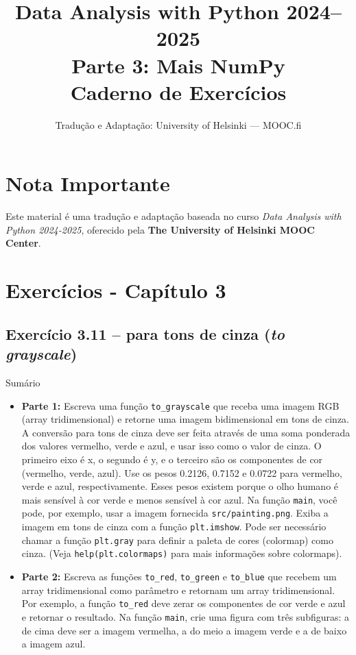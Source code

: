 \documentclass[11pt,a4paper]{article}
\title{\textbf{Data Analysis with Python 2024--2025}\\Parte 3: Mais NumPy\\\large Caderno de Exercícios}
\author{Tradução e Adaptação: University of Helsinki --- MOOC.fi}
\date{}
\begin{document}
\maketitle

\section*{Nota Importante}
Este material é uma tradução e adaptação baseada no curso \textit{Data Analysis with Python 2024-2025}, oferecido pela \textbf{The University of Helsinki MOOC Center}.

\tableofcontents
\newpage

\section{Exercícios - Capítulo 3}

\subsection*{Exercício 3.11 -- para tons de cinza (\textit{to grayscale})}

\begin{exercicio}{Sumário}
\begin{itemize}
    \item \textbf{Parte 1:} Escreva uma função \texttt{to\_grayscale} que receba uma imagem RGB (array tridimensional) e retorne uma imagem bidimensional em tons de cinza. A conversão para tons de cinza deve ser feita através de uma soma ponderada dos valores vermelho, verde e azul, e usar isso como o valor de cinza. O primeiro eixo é x, o segundo é y, e o terceiro são os componentes de cor (vermelho, verde, azul). Use os pesos 0.2126, 0.7152 e 0.0722 para vermelho, verde e azul, respectivamente. Esses pesos existem porque o olho humano é mais sensível à cor verde e menos sensível à cor azul. Na função \texttt{main}, você pode, por exemplo, usar a imagem fornecida \texttt{src/painting.png}. Exiba a imagem em tons de cinza com a função \texttt{plt.imshow}. Pode ser necessário chamar a função \texttt{plt.gray} para definir a paleta de cores (colormap) como cinza. (Veja \texttt{help(plt.colormaps)} para mais informações sobre colormaps).
    \item \textbf{Parte 2:} Escreva as funções \texttt{to\_red}, \texttt{to\_green} e \texttt{to\_blue} que recebem um array tridimensional como parâmetro e retornam um array tridimensional. Por exemplo, a função \texttt{to\_red} deve zerar os componentes de cor verde e azul e retornar o resultado. Na função \texttt{main}, crie uma figura com três subfiguras: a de cima deve ser a imagem vermelha, a do meio a imagem verde e a de baixo a imagem azul.
\end{itemize}
\end{exercicio}
\end{document}
